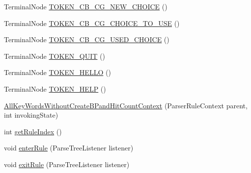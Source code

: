 \begin{DoxyCompactItemize}
\item 
Terminal\+Node \hyperlink{classgov_1_1nasa_1_1jpf_1_1inspector_1_1client_1_1parser_1_1_console_grammar_parser_1_1_all_key_5423188b2439879f44801649cdee10f6_a507549232c8f9cf14b082c381a6a03c9}{T\+O\+K\+E\+N\+\_\+\+C\+B\+\_\+\+C\+G\+\_\+\+N\+E\+W\+\_\+\+C\+H\+O\+I\+CE} ()
\item 
Terminal\+Node \hyperlink{classgov_1_1nasa_1_1jpf_1_1inspector_1_1client_1_1parser_1_1_console_grammar_parser_1_1_all_key_5423188b2439879f44801649cdee10f6_a772af07a91a544314b73d2eccfd99a93}{T\+O\+K\+E\+N\+\_\+\+C\+B\+\_\+\+C\+G\+\_\+\+C\+H\+O\+I\+C\+E\+\_\+\+T\+O\+\_\+\+U\+SE} ()
\item 
Terminal\+Node \hyperlink{classgov_1_1nasa_1_1jpf_1_1inspector_1_1client_1_1parser_1_1_console_grammar_parser_1_1_all_key_5423188b2439879f44801649cdee10f6_a1000be80a344b942285e01c91bbc9a4a}{T\+O\+K\+E\+N\+\_\+\+C\+B\+\_\+\+C\+G\+\_\+\+U\+S\+E\+D\+\_\+\+C\+H\+O\+I\+CE} ()
\item 
Terminal\+Node \hyperlink{classgov_1_1nasa_1_1jpf_1_1inspector_1_1client_1_1parser_1_1_console_grammar_parser_1_1_all_key_5423188b2439879f44801649cdee10f6_a09d74440cbd3a85edb9947617166e121}{T\+O\+K\+E\+N\+\_\+\+Q\+U\+IT} ()
\item 
Terminal\+Node \hyperlink{classgov_1_1nasa_1_1jpf_1_1inspector_1_1client_1_1parser_1_1_console_grammar_parser_1_1_all_key_5423188b2439879f44801649cdee10f6_a76245e3b7cb0a7068dcb8ff30e3e5c19}{T\+O\+K\+E\+N\+\_\+\+H\+E\+L\+LO} ()
\item 
Terminal\+Node \hyperlink{classgov_1_1nasa_1_1jpf_1_1inspector_1_1client_1_1parser_1_1_console_grammar_parser_1_1_all_key_5423188b2439879f44801649cdee10f6_a0b19428d7a0195293b71d8f0898c6818}{T\+O\+K\+E\+N\+\_\+\+H\+E\+LP} ()
\item 
\hyperlink{classgov_1_1nasa_1_1jpf_1_1inspector_1_1client_1_1parser_1_1_console_grammar_parser_1_1_all_key_5423188b2439879f44801649cdee10f6_a7ee0c79a4bf12509c2eca326fd8a613a}{All\+Key\+Words\+Without\+Create\+B\+Pand\+Hit\+Count\+Context} (Parser\+Rule\+Context parent, int invoking\+State)
\item 
int \hyperlink{classgov_1_1nasa_1_1jpf_1_1inspector_1_1client_1_1parser_1_1_console_grammar_parser_1_1_all_key_5423188b2439879f44801649cdee10f6_a06021587ced90ae9e80c77ad848074ed}{get\+Rule\+Index} ()
\item 
void \hyperlink{classgov_1_1nasa_1_1jpf_1_1inspector_1_1client_1_1parser_1_1_console_grammar_parser_1_1_all_key_5423188b2439879f44801649cdee10f6_af9d5043d5357bc92b77f4c2e54256d4c}{enter\+Rule} (Parse\+Tree\+Listener listener)
\item 
void \hyperlink{classgov_1_1nasa_1_1jpf_1_1inspector_1_1client_1_1parser_1_1_console_grammar_parser_1_1_all_key_5423188b2439879f44801649cdee10f6_adff77b5aeb39e6ba7c1590121a2b0bc8}{exit\+Rule} (Parse\+Tree\+Listener listener)
\end{DoxyCompactItemize}
